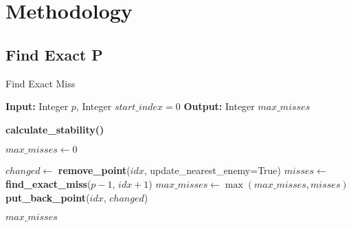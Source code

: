 \documentclass{article}
\begin{document}
\renewcommand{\thealgorithm}{\thesubsubsection.\arabic{algorithm}}

\setcounter{section}{3}
\section{Methodology}

\subsection{Find Exact P}

\begin{algorithm}
    \caption{Find Exact Miss}
    \begin{algorithmic}[1] %
    
    \STATE \textbf{Input:} Integer $p$, Integer $start\_index = 0$
    \STATE \textbf{Output:} Integer $max\_misses$
    
        \RETURN \textbf{calculate\_stability()}
    \ENDIF
    
    \STATE $max\_misses \gets 0$
    
        \STATE $changed \gets$ \textbf{remove\_point}($idx$, update\_nearest\_enemy=True)
        \STATE $misses \gets$ \textbf{find\_exact\_miss}($p - 1$, $idx + 1$)
        \STATE $max\_misses \gets \max(max\_misses, misses)$
        \STATE \textbf{put\_back\_point}($idx$, $changed$)
    \ENDFOR
    
    \RETURN $max\_misses$
    
    \end{algorithmic}
    \end{algorithm}
    
\end{document}
